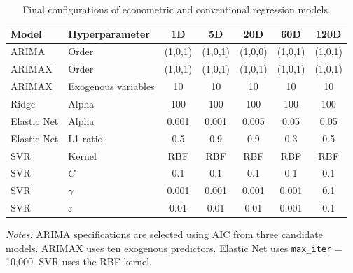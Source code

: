 \documentclass[runningheads,orivec]{llncs}
\begin{document}
\begin{table}[htbp]
\centering
\caption{Final configurations of econometric and conventional regression models.}\label{tab:config_econ_ml}
\setlength{\tabcolsep}{4.5pt}
\begin{tabular}{llccccc}
\hline
Model & Hyperparameter & 1D & 5D & 20D & 60D & 120D \\
\hline
ARIMA       & Order               & (1,0,1) & (1,0,1) & (1,0,0) & (1,0,1) & (1,0,1) \\
ARIMAX      & Order               & (1,0,1) & (1,0,1) & (1,0,1) & (1,0,1) & (1,0,1) \\
ARIMAX      & Exogenous variables & 10      & 10      & 10      & 10      & 10 \\
Ridge       & Alpha               & 100     & 100     & 100     & 100     & 100 \\
Elastic Net & Alpha               & 0.001   & 0.001   & 0.005   & 0.05    & 0.05 \\
Elastic Net & L1 ratio            & 0.5     & 0.9     & 0.9     & 0.3     & 0.5 \\
SVR         & Kernel              & RBF     & RBF     & RBF     & RBF     & RBF \\
SVR         & $C$                 & 0.1     & 0.1     & 0.1     & 0.1     & 0.1 \\
SVR         & $\gamma$            & 0.001   & 0.001   & 0.001   & 0.001   & 0.1 \\
SVR         & $\varepsilon$       & 0.01    & 0.01    & 0.01    & 0.001   & 0.1 \\
\hline
\end{tabular}
\par\vspace{4pt}\parbox{\linewidth}{\scriptsize\textit{Notes:} ARIMA specifications are selected using AIC from three candidate models. ARIMAX uses ten exogenous predictors. Elastic Net uses \texttt{max\_iter} = 10,000. SVR uses the RBF kernel.}
\end{table}
\end{document}
